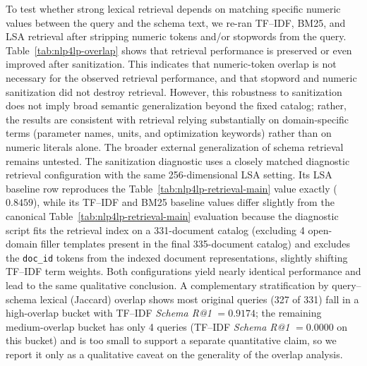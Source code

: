 \documentclass[pdflatex,sn-basic,Numbered]{sn-jnl}
\begin{document}
To test whether strong lexical retrieval depends on matching specific numeric values between the query and the schema text, we re-ran TF--IDF, BM25, and LSA retrieval after stripping numeric tokens and/or stopwords from the query. Table~\ref{tab:nlp4lp-overlap} shows that retrieval performance is preserved or even improved after sanitization. This indicates that numeric-token overlap is not necessary for the observed retrieval performance, and that stopword and numeric sanitization did not destroy retrieval. However, this robustness to sanitization does not imply broad semantic generalization beyond the fixed catalog; rather, the results are consistent with retrieval relying substantially on domain-specific terms (parameter names, units, and optimization keywords) rather than on numeric literals alone. The broader external generalization of schema retrieval remains untested. The sanitization diagnostic uses a closely matched diagnostic retrieval configuration with the same 256-dimensional LSA setting. Its LSA baseline row reproduces the Table~\ref{tab:nlp4lp-retrieval-main} value exactly ($0.8459$), while its TF--IDF and BM25 baseline values differ slightly from the canonical Table~\ref{tab:nlp4lp-retrieval-main} evaluation because the diagnostic script fits the retrieval index on a 331-document catalog (excluding 4 open-domain filler templates present in the final 335-document catalog) and excludes the \texttt{doc\_id} tokens from the indexed document representations, slightly shifting TF--IDF term weights. Both configurations yield nearly identical performance and lead to the same qualitative conclusion. A complementary stratification by query--schema lexical (Jaccard) overlap shows most original queries (327 of 331) fall in a high-overlap bucket with TF--IDF \textit{Schema R@1} $=0.9174$; the remaining medium-overlap bucket has only 4 queries (TF--IDF \textit{Schema R@1} $=0.0000$ on this bucket) and is too small to support a separate quantitative claim, so we report it only as a qualitative caveat on the generality of the overlap analysis.
\end{document}
